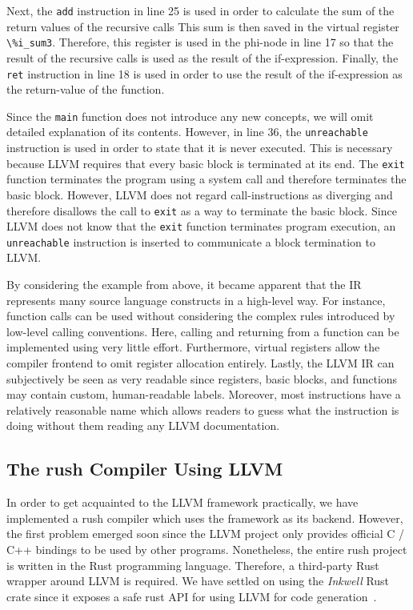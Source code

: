 Next, the \texttt{add} instruction in line 25 is used in order to calculate the sum of the return values of the recursive calls
This sum is then saved in the virtual register \Verb|\%i_sum3|.
Therefore, this register is used in the phi-node in line 17 so that the result of the recursive calls is used as the result of the if-expression.
Finally, the \texttt{ret} instruction in line 18 is used in order to use the result of the if-expression as the return-value of the function.

Since the \texttt{main} function does not introduce any new concepts, we will omit detailed explanation of its contents.
However, in line 36, the \texttt{unreachable} instruction is used in order to state that it is never executed.
This is necessary because LLVM requires that every basic block is terminated at its end.
The \texttt{exit} function terminates the program using a system call and therefore terminates the basic block.
However, LLVM does not regard call-instructions as diverging and therefore disallows the call to \texttt{exit} as a way to terminate the basic block.
Since LLVM does not know that the \texttt{exit} function terminates program execution, an \texttt{unreachable}  instruction is inserted to communicate a block termination to LLVM.

By considering the example from above, it became apparent that the IR represents many source language constructs in a high-level way.
For instance, function calls can be used without considering the complex rules introduced by low-level calling conventions.
Here, calling and returning from a function can be implemented using very little effort.
Furthermore, virtual registers allow the compiler frontend to omit register allocation entirely.
Lastly, the LLVM IR can subjectively be seen as very readable since registers, basic blocks, and functions may contain custom, human-readable labels.
Moreover, most instructions have a relatively reasonable name which allows readers to guess what the instruction is doing without them reading any LLVM documentation.


\subsection{The rush Compiler Using LLVM}

In order to get acquainted to the LLVM framework practically, we have implemented a rush compiler which uses the framework as its backend.
However, the first problem emerged soon since the LLVM project only provides official C / C++ bindings to be used by other programs.
Nonetheless, the entire rush project is written in the Rust programming language.
Therefore, a third-party Rust wrapper around LLVM is required.
We have settled on using the \emph{Inkwell} Rust crate since it exposes a safe rust API for using LLVM for code generation~\cite{Inkwell2023}.

